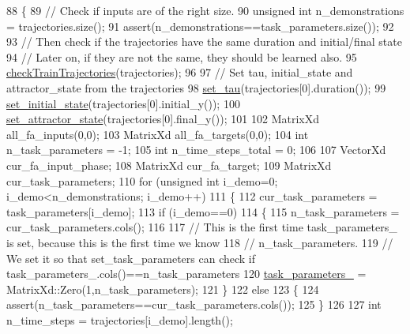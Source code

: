 \begin{DoxyCode}
88     \{
89         \textcolor{comment}{// Check if inputs are of the right size.}
90         \textcolor{keywordtype}{unsigned} \textcolor{keywordtype}{int} n\_demonstrations = trajectories.size();
91         assert(n\_demonstrations==task\_parameters.size());
92 
93         \textcolor{comment}{// Then check if the trajectories have the same duration and initial/final state}
94         \textcolor{comment}{// Later on, if they are not the same, they should be learned also.}
95         \hyperlink{classDmpBbo_1_1DmpContextual_aba2e356cdf0cfe688fdcf02ffe68c4d2}{checkTrainTrajectories}(trajectories);
96 
97         \textcolor{comment}{// Set tau, initial\_state and attractor\_state from the trajectories }
98         \hyperlink{classDmpBbo_1_1Dmp_a17edb45ef62a4ef7f8c78e4f8f68b249}{set\_tau}(trajectories[0].duration());
99         \hyperlink{classDmpBbo_1_1Dmp_ad4e11c676c2add8a992db1caf542f0a0}{set\_initial\_state}(trajectories[0].initial\_y());
100         \hyperlink{classDmpBbo_1_1Dmp_a6dccbd077acfd148f528a48a72a4003f}{set\_attractor\_state}(trajectories[0].final\_y());
101 
102         MatrixXd all\_fa\_inputs(0,0);
103         MatrixXd all\_fa\_targets(0,0);  
104         \textcolor{keywordtype}{int} n\_task\_parameters = -1;
105         \textcolor{keywordtype}{int} n\_time\_steps\_total = 0;
106 
107         VectorXd cur\_fa\_input\_phase;
108         MatrixXd cur\_fa\_target;
109         MatrixXd cur\_task\_parameters;
110         \textcolor{keywordflow}{for} (\textcolor{keywordtype}{unsigned} \textcolor{keywordtype}{int} i\_demo=0; i\_demo<n\_demonstrations; i\_demo++)
111         \{
112             cur\_task\_parameters = task\_parameters[i\_demo]; 
113             \textcolor{keywordflow}{if} (i\_demo==0)
114             \{
115                 n\_task\_parameters = cur\_task\_parameters.cols();
116 
117                 \textcolor{comment}{// This is the first time task\_parameters\_ is set, because this is the first time we know }
118                 \textcolor{comment}{// n\_task\_parameters.}
119                 \textcolor{comment}{// We set it so that set\_task\_parameters can check if
       task\_parameters\_.cols()==n\_task\_parameters}
120                 \hyperlink{classDmpBbo_1_1DmpContextual_af0d2e6fef248e131b92fc244b55b50c6}{task\_parameters\_} = MatrixXd::Zero(1,n\_task\_parameters);
121             \}
122             \textcolor{keywordflow}{else}
123             \{
124                 assert(n\_task\_parameters==cur\_task\_parameters.cols());
125             \}
126 
127             \textcolor{keywordtype}{int} n\_time\_steps = trajectories[i\_demo].length();

\end{DoxyCode}

